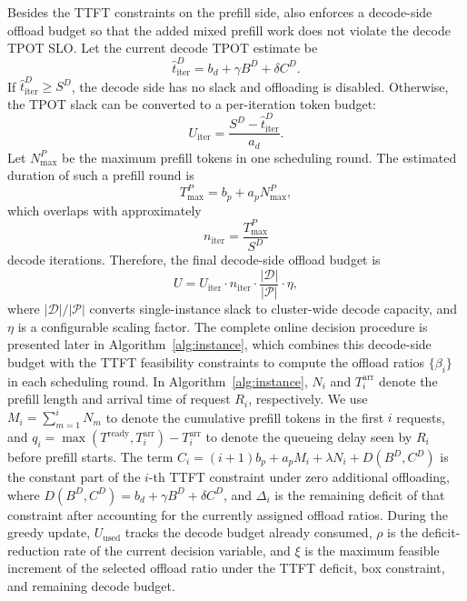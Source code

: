 Besides the TTFT constraints on the prefill side, \instance also enforces a decode-side offload budget so that the added mixed prefill work does not violate the decode TPOT SLO.
Let the current decode TPOT estimate be
\begin{equation}
    \hat{t}^{D}_{\mathrm{iter}} = b_d + \gamma B^D + \delta C^D.
\end{equation}
If $\hat{t}^{D}_{\mathrm{iter}} \ge S^D$, the decode side has no slack and offloading is disabled.
Otherwise, the TPOT slack can be converted to a per-iteration token budget:
\begin{equation}
    U_{\mathrm{iter}} = \frac{S^D - \hat{t}^{D}_{\mathrm{iter}}}{a_d}.
\end{equation}
Let $N_{\max}^{P}$ be the maximum prefill tokens in one scheduling round.
The estimated duration of such a prefill round is
\begin{equation}
    T^P_{\max} = b_p + a_pN_{\max}^{P},
\end{equation}
which overlaps with approximately
\begin{equation}
    n_{\mathrm{iter}} = \frac{T^P_{\max}}{S^D}
\end{equation}
decode iterations.
Therefore, the final decode-side offload budget is
\begin{equation}
    U
    =
    U_{\mathrm{iter}}
    \cdot n_{\mathrm{iter}}
    \cdot \frac{|\mathcal{D}|}{|\mathcal{P}|}
    \cdot \eta,
\end{equation}
where $|\mathcal{D}|/|\mathcal{P}|$ converts single-instance slack to cluster-wide decode capacity, and $\eta$ is a configurable scaling factor.
The complete online decision procedure is presented later in Algorithm~\ref{alg:instance}, which combines this decode-side budget with the TTFT feasibility constraints to compute the offload ratios $\{\beta_i\}$ in each scheduling round.
In Algorithm~\ref{alg:instance}, $N_i$ and $T_i^{\mathrm{arr}}$ denote the prefill length and arrival time of request $R_i$, respectively.
We use $M_i=\sum_{m=1}^{i}N_m$ to denote the cumulative prefill tokens in the first $i$ requests, and $q_i=\max(T^{\mathrm{ready}},T_i^{\mathrm{arr}})-T_i^{\mathrm{arr}}$ to denote the queueing delay seen by $R_i$ before prefill starts.
The term $C_i=(i+1)b_p+a_pM_i+\lambda N_i+D(B^D,C^D)$ is the constant part of the $i$-th TTFT constraint under zero additional offloading, where $D(B^D,C^D)=b_d+\gamma B^D+\delta C^D$, and $\Delta_i$ is the remaining deficit of that constraint after accounting for the currently assigned offload ratios.
During the greedy update, $U_{\mathrm{used}}$ tracks the decode budget already consumed, $\rho$ is the deficit-reduction rate of the current decision variable, and $\xi$ is the maximum feasible increment of the selected offload ratio under the TTFT deficit, box constraint, and remaining decode budget.

